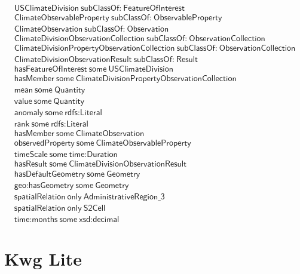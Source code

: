 \begin{align}
  \textsf{USClimateDivision}~\textsf{subClassOf:}~\textsf{FeatureOfInterest}\\
  \textsf{ClimateObservableProperty}~\textsf{subClassOf:}~\textsf{ObservableProperty}\\
  \textsf{ClimateObservation}~\textsf{subClassOf:}~\textsf{Observation}\\
  \textsf{ClimateDivisionObservationCollection}~\textsf{subClassOf:}~\textsf{ObservationCollection}\\
  \textsf{ClimateDivisionPropertyObservationCollection}~\textsf{subClassOf:}~\textsf{ObservationCollection}\\
  \textsf{ClimateDivisionObservationResult}~\textsf{subClassOf:}~\textsf{Result}\\
  \textsf{hasFeatureOfInterest}~\textsf{some}~\textsf{USClimateDivision}\\
  \textsf{hasMember}~\textsf{some}~\textsf{ClimateDivisionPropertyObservationCollection}\\
  \textsf{mean}~\textsf{some}~\textsf{Quantity}\\
  \textsf{value}~\textsf{some}~\textsf{Quantity}\\
  \textsf{anomaly}~\textsf{some}~\textsf{rdfs:Literal}\\
  \textsf{rank}~\textsf{some}~\textsf{rdfs:Literal}\\
  \textsf{hasMember}~\textsf{some}~\textsf{ClimateObservation}\\
  \textsf{observedProperty}~\textsf{some}~\textsf{ClimateObservableProperty}\\
  \textsf{timeScale}~\textsf{some}~\textsf{time:Duration}\\
  \textsf{hasResult}~\textsf{some}~\textsf{ClimateDivisionObservationResult}\\
  \textsf{hasDefaultGeometry}~\textsf{some}~\textsf{Geometry}\\
  \textsf{geo:hasGeometry}~\textsf{some}~\textsf{Geometry}\\
  \textsf{spatialRelation}~\textsf{only}~\textsf{AdministrativeRegion\_3}\\
  \textsf{spatialRelation}~\textsf{only}~\textsf{S2Cell}\\
  \textsf{time:months}~\textsf{some}~\textsf{xsd:decimal}\end{align}



\section{Kwg Lite}
\label{sec:kwg-lite}
